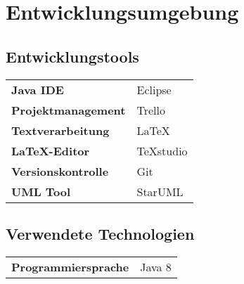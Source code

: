 \chapter{Entwicklungsumgebung}
\section{Entwicklungstools}
\begin{table}[h!]
	\begin{tabular}{l|l}
		\textbf{Java IDE} & Eclipse\\
		\textbf{Projektmanagement} & Trello\\
		\textbf{Textverarbeitung} & \LaTeX\\
		\textbf{\LaTeX-Editor} & TeXstudio\\
		\textbf{Versionskontrolle} & Git\\
		\textbf{UML Tool} & StarUML
	\end{tabular}
\end{table}
\section{Verwendete Technologien}
\begin{table}[h!]
	\begin{tabular}{l|l}
		\textbf{Programmiersprache} & Java 8
	\end{tabular}
\end{table}